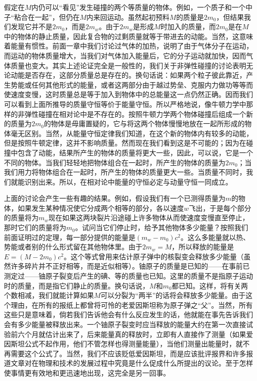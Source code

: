 假定在$M$内仍可以“看见”发生碰撞的两个等质量的物体。例如，一个质子和一个中子“粘合在一起”，但仍在$M$内来回运动。虽然起初预料$M$的质量是$2m_0$，但结果我们发现它并不是$2m_0$，而是$2m_w$。由于$2m_w$是形成$M$时加入的质量，而$2m_0$是在$M$中的物体的静止质量，因此复合物的过剩质量就等于带进去的动能。当然，这意味着能量有惯性。前面一章中我们讨论过气体的加热，说明了由于气体分子在运动，而运动的物体质量增大，当我们对气体加入能量后，它的分子运动就加快，因而气体质量也变大。其实上述论证完全是一般性的，我们关于非弹性碰撞的讨论表明无论动能是否存在，这部分质量总是存在的。换句话说：如果两个粒子彼此靠近，产生势能或任何其他形式的能量，或者这两部分由于越过势垒、克服内力做功等等而使速度变慢，这时质量总是等于加入到物体中的总能量这一点仍然正确。因而我们可以看到上面所推导的质量守恒等价于能量守恒。所以严格地说，像牛顿力学中那样的非弹性碰撞在相对论中是不存在的。按照牛顿力学两个物体碰撞后组成一个新的质量为$2m_0$的物体是毋庸置疑的，它与将这两个物体慢慢地放在一起所形成的物体毫无区别。当然，从能量守恒定律我们知道，在这个新的物体内有较多的动能，但是按照牛顿定律，这并不影响质量。然而现在我们看到这是不可能的；因为在碰撞中包含了动能，结果所产生的物体的质量将更大一些，因此，可以说，它是一个不同的物体。当我们轻轻地把物体组合在一起时，所产生的物体的质量为$2m_0$；当我们用力将物体组合在一起时，所产生的物体的质量更大一些。当质量不同时，我们就能识别出来。所以，在相对论中能量的守恒必定与动量守恒一同成立。

上面的讨论会产生一些有趣的结果。例如，假设我们有一个已测得质量为$m$的物体，如果发生某种情况使它分成两个相等的部分，各以速度$w$飞出，于是每个部分的质量将为$m_w$现在如果这两块裂片沿途碰上许多物体从而使速度变慢直至停止，那时它们的质量将为$m_0$。试问当它们停止时，给予其他物体多少能量？按照我们前面证明过的定理，每一部分提供的能量是$(m_w-m_0)c^2$。这么多能量就以热、势能或者别的什么形式留在其他物体里。由于$2m_w=M$，所以释放的能量是$E=(M-2m_0)c^2$。这个等式曾用来估计原子弹中的核裂变会释放多少能量（虽然许多碎片并不正好相等，而是近似相等）。铀原子的质量是已知的——在事前已测定过——铀原子裂变后产生的碘、等的质量也已知。这里的质量不是指原子运动时的质量，而是指它们静止的质量。换句话说，$M$和$m_0$都已知。这样，将有关两个数相减，我们就能计算如果$M$可以分裂为“两半”的话将会释放多少能量。由于这个理由，在所有的报纸上都曾将可怜的老爱因斯坦称为原子弹之“父”。当然，所有这些只是意味着，倘若我们告诉他会有什么反应发生的话，他就能在事先告诉我们会有多少能量被释放出来。一个铀原子裂变时应当释放的能量大约在第一次直接试验前六个月就估计出来了，后来能量真的释放时，立即有人直接作了测量（如果爱因斯坦公式不起作用，他们不管怎样也得测量能量），当他们测量出能量时，就不再需要这个公式了。当然，我们不应该贬低爱因斯坦，而是应该批评报界和许多报道文章对在物理和技术的发展过程中究竟是什么促成什么所提出的议论。至于怎样使事情更有效地和更迅速地出现，这完全是另一回事。

